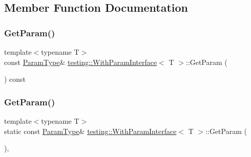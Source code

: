 \subsection{Member Function Documentation}
\mbox{\label{classtesting_1_1_with_param_interface_aa7b9028f06ee7ec1174bb25317b07eb2}} 
\subsubsection{\texorpdfstring{GetParam()}{GetParam()}\hspace{0.1cm}{\footnotesize\ttfamily [1/3]}}
{\footnotesize\ttfamily template$<$typename T$>$ \\
const \mbox{\hyperlink{classtesting_1_1_with_param_interface_a343febaaebf1f025bda484f841d4fec1}{Param\+Type}}\& \mbox{\hyperlink{classtesting_1_1_with_param_interface}{testing\+::\+With\+Param\+Interface}}$<$ T $>$\+::Get\+Param (\begin{DoxyParamCaption}{ }\end{DoxyParamCaption}) const\hspace{0.3cm}{\ttfamily [inline]}}

\mbox{\label{classtesting_1_1_with_param_interface_a1078d4493d7aa4d3e50d1d6c661bee4d}} 
\subsubsection{\texorpdfstring{GetParam()}{GetParam()}\hspace{0.1cm}{\footnotesize\ttfamily [2/3]}}
{\footnotesize\ttfamily template$<$typename T$>$ \\
static const \mbox{\hyperlink{classtesting_1_1_with_param_interface_a343febaaebf1f025bda484f841d4fec1}{Param\+Type}}\& \mbox{\hyperlink{classtesting_1_1_with_param_interface}{testing\+::\+With\+Param\+Interface}}$<$ T $>$\+::Get\+Param (\begin{DoxyParamCaption}{ }\end{DoxyParamCaption})\hspace{0.3cm}{\ttfamily [inline]}, {\ttfamily [static]}}

